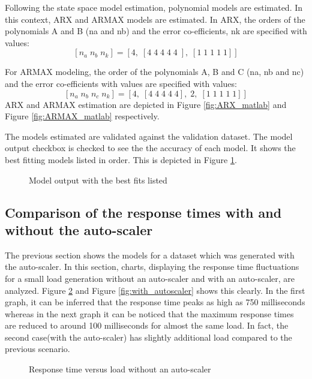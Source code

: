 \documentclass[article,type=msc,colorback,12pt,accentcolor=tud8b,table]{tudthesis}
\begin{document}
	Following the state space model estimation, polynomial models are estimated. In this context, ARX and ARMAX models are estimated. In ARX, the orders of the polynomials A and B (na and nb) and the error co-efficients, nk are specified with values: $$ [n_a\;n_b \;n_k] = [ 4,\; [ 4\; 4\; 4\; 4\; 4\; ],\; [ 1 \;1 \;1 \;1 \;1 ] ]$$
	
	For ARMAX modeling, the order of the polynomials A, B and C (na, nb and nc) and the error co-efficients with values are specified with values: $$ [n_a\; n_b\; n_c\; n_k] = [ 4,\; [ 4\; 4\; 4\; 4\; 4 ], \;2,\; [ 1\; 1\; 1\; 1\; 1 ] ]$$ ARX and ARMAX estimation are depicted in Figure \ref{fig:ARX_matlab} and Figure \ref{fig:ARMAX_matlab} respectively.

	The models estimated are validated against the validation dataset. The model output checkbox is checked to see the the accuracy of each model. It shows the best fitting models listed in order. This is depicted in Figure \ref{fig:model_output}.
   \begin{figure}[H]
		    	\begin{center}
		    		\makebox[\textwidth]{\texttt{[image: E14]}}
		    	\end{center}
		    	\caption{Model output with the best fits listed}
		    		\label{fig:model_output}
   \end{figure}
\subsection{Comparison of the response times with and without the auto-scaler}
The previous section shows the models for a dataset which was generated with the auto-scaler. In this section, charts, displaying the response time fluctuations for a small load generation without an auto-scaler and with an auto-scaler, are analyzed. Figure \ref{fig:without_autoscaler} and Figure \ref{fig:with_autoscaler} shows this clearly. In the first graph, it can be inferred that the response time peaks as high as 750 milliseconds whereas in the next graph it can be noticed that the maximum response times are reduced to around 100 milliseconds for almost the same load. In fact, the second case(with the auto-scaler) has slightly additional load compared to the previous scenario.

   \begin{figure}[H]
   	\begin{center}
   		\makebox[\textwidth]{\texttt{[image: E15]}}
   	\end{center}
   	\caption{Response time versus load without an auto-scaler}
   		\label{fig:without_autoscaler}
   \end{figure}
   
\end{document}
